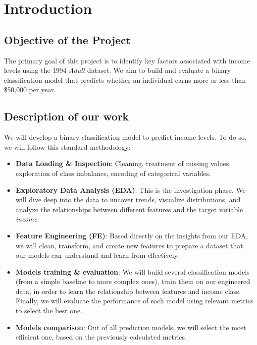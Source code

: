\thispagestyle{plain}

\chapter{Introduction}
\label{cp:introduction}

\vspace{2 \baselineskip}
\section{Objective of the Project}
The primary goal of this project is to identify key factors associated with income levels using the 1994 \emph{Adult} dataset. We aim to build and evaluate a binary classification model that predicts whether an individual earns more or less than \$50,000 per year. 

\vspace{2 \baselineskip}
\section{Description of our work}
We will develop a binary classification model to predict income levels. To do so, we will follow this standard methodology: 

\begin{itemize}
    \item \textbf{Data Loading \& Inspection}: Cleaning, treatment of missing values, exploration of class imbalance, encoding of categorical variables.

    \item \textbf{Exploratory Data Analysis (EDA)}: 
This is the investigation phase. We will dive deep into the data to uncover trends, visualize distributions, and analyze the relationships between different features and the target variable \emph{income}.

    \item \textbf{Feature Engineering (FE)}:
Based directly on the insights from our EDA, we will clean, transform, and create new features to prepare a dataset that our models can understand and learn from effectively.

    \item \textbf{Models training \& evaluation}: 
We will build several classification models (from a simple baseline to more complex ones), train them on our engineered data, in order to learn the relationship between features and income class. Finally, we will evaluate the performance of each model using relevant metrics to select the best one.

    \item \textbf{Models comparison}: 
Out of all prediction models, we will select the most efficient one, based on the previously calculated metrics. 
\end{itemize}

